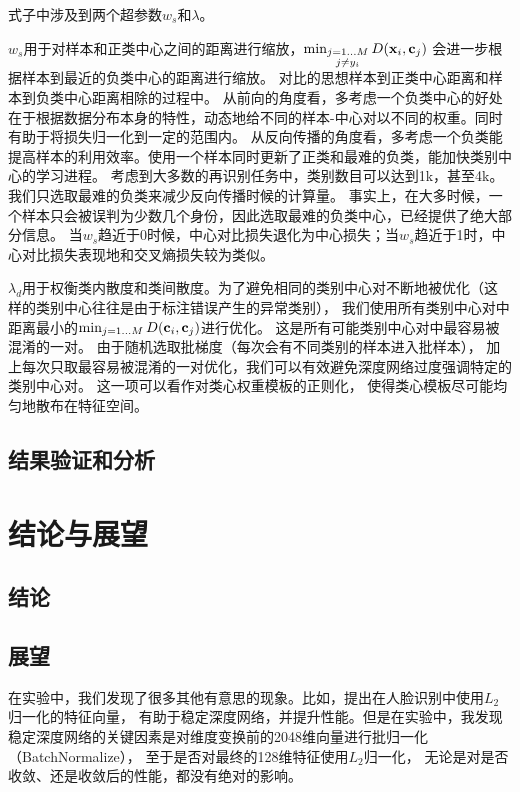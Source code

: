 式子中涉及到两个超参数$w_s$和$\lambda$。

$w_s$用于对样本和正类中心之间的距离进行缩放，$\min_{\substack{
				j=1...M \\
				j \neq y_i }} D(
		{\mathbf{x}}_{i}, {\mathbf{c}}_{j}
		)$
会进一步根据样本到最近的负类中心的距离进行缩放。
对比的思想样本到正类中心距离和样本到负类中心距离相除的过程中。
从前向的角度看，多考虑一个负类中心的好处在于根据数据分布本身的特性，动态地给不同的样本-中心对以不同的权重。同时有助于将损失归一化到一定的范围内。
从反向传播的角度看，多考虑一个负类能提高样本的利用效率。使用一个样本同时更新了正类和最难的负类，能加快类别中心的学习进程。
考虑到大多数的再识别任务中，类别数目可以达到1k，甚至4k。我们只选取最难的负类来减少反向传播时候的计算量。
事实上，在大多时候，一个样本只会被误判为少数几个身份，因此选取最难的负类中心，已经提供了绝大部分信息。
当$w_s$趋近于0时候，中心对比损失退化为中心损失；当$w_s$趋近于1时，中心对比损失表现地和交叉熵损失较为类似。

$\lambda_d$用于权衡类内散度和类间散度。为了避免相同的类别中心对不断地被优化（这样的类别中心往往是由于标注错误产生的异常类别），
我们使用所有类别中心对中距离最小的$\min_{j=1...M} D({\mathbf{c}}_i,{\mathbf{c}}_j)$进行优化。
这是所有可能类别中心对中最容易被混淆的一对。
由于随机选取批梯度（每次会有不同类别的样本进入批样本），
加上每次只取最容易被混淆的一对优化，我们可以有效避免深度网络过度强调特定的类别中心对。
这一项可以看作对类心权重模板的正则化，
使得类心模板尽可能均匀地散布在特征空间。


\section{结果验证和分析}

\chapter{结论与展望}

\section{结论}



\section{展望}

在实验中，我们发现了很多其他有意思的现象。比如，\misscite 提出在人脸识别中使用$L_2$归一化的特征向量，
有助于稳定深度网络，并提升性能。但是在实验中，我发现稳定深度网络的关键因素是对维度变换前的2048维向量进行批归一化（BatchNormalize），
至于是否对最终的128维特征使用$L_2$归一化，
无论是对是否收敛、还是收敛后的性能，都没有绝对的影响。





% 
\printbibliography[heading=chapbib]
